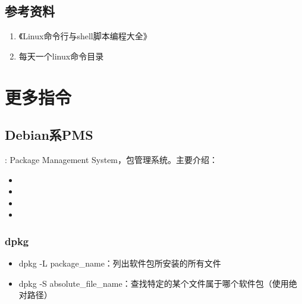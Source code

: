\documentclass[letterpaper,10pt,english]{sphinxmanual}
\begin{document}
\subsection{参考资料}
\label{\detokenize{linux/01_basic:id5}}\begin{enumerate}
\item {} 
《Linux命令行与shell脚本编程大全》

\item {} 
每天一个linux命令目录

\end{enumerate}
\begin{quote}

\end{quote}


\section{更多指令}
\label{\detokenize{linux/02_more::doc}}\label{\detokenize{linux/02_more:id1}}

\subsection{Debian系PMS}
\label{\detokenize{linux/02_more:debianpms}}
 : Package Management System，包管理系统。主要介绍：
\begin{itemize}
\item {} 

\item {} 

\item {} 

\item {} 

\end{itemize}


\subsubsection{dpkg}
\label{\detokenize{linux/02_more:dpkg}}\begin{itemize}
\item {} 
dpkg -L package\_name：列出软件包所安装的所有文件

\item {} 
dpkg -S absolute\_file\_name：查找特定的某个文件属于哪个软件包（使用绝对路径）

\end{itemize}
\end{document}
